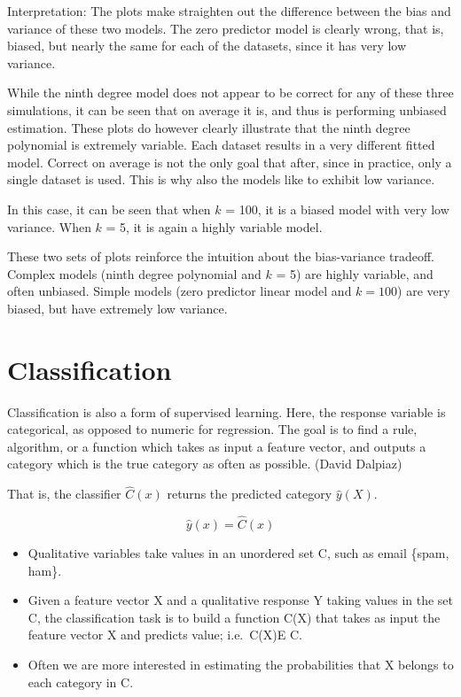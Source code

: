 \documentclass[]{report}
\providecommand{\tightlist}{%
  \setlength{\itemsep}{0pt}\setlength{\parskip}{0pt}}
\begin{document}
Interpretation: The plots make straighten out the difference between the
bias and variance of these two models. The zero predictor model is
clearly wrong, that is, biased, but nearly the same for each of the
datasets, since it has very low variance.

While the ninth degree model does not appear to be correct for any of
these three simulations, it can be seen that on average it is, and thus
is performing unbiased estimation. These plots do however clearly
illustrate that the ninth degree polynomial is extremely variable. Each
dataset results in a very different fitted model. Correct on average is
not the only goal that after, since in practice, only a single dataset
is used. This is why also the models like to exhibit low variance.

In this case, it can be seen that when \(k\) = 100, it is a biased model
with very low variance. When \(k\) = 5, it is again a highly variable
model.

These two sets of plots reinforce the intuition about the bias-variance
tradeoff. Complex models (ninth degree polynomial and \(k\) = 5) are
highly variable, and often unbiased. Simple models (zero predictor
linear model and \(k = 100\)) are very biased, but have extremely low
variance.

\chapter{Classification}\label{classification}

Classification is also a form of supervised learning. Here, the response
variable is categorical, as opposed to numeric for regression. The goal
is to find a rule, algorithm, or a function which takes as input a
feature vector, and outputs a category which is the true category as
often as possible. (David Dalpiaz)

That is, the classifier \(\hat{C}(x)\) returns the predicted category
\(\hat{y}(X)\).

\[\hat{y}(x) = \hat{C}(x)\]

\begin{itemize}
\tightlist
\item
  Qualitative variables take values in an unordered set C, such as email
  \{spam, ham\}.
\item
  Given a feature vector X and a qualitative response Y taking values in
  the set C, the classification task is to build a function C(X) that
  takes as input the feature vector X and predicts value; i.e.~C(X)E C.
\item
  Often we are more interested in estimating the probabilities that X
  belongs to each category in C.
\end{itemize}
\end{document}
